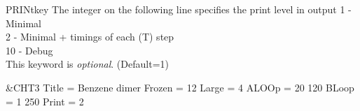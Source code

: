 \begin{keywordlist}
\item[PRINtkey]
The integer on the following line specifies the print level in output
1  - Minimal \\
2  - Minimal + timings of each (T) step \\
10 - Debug \\
This keyword is {\it optional}. (Default=1)
\end{keywordlist}

\begin{inputlisting}
 &CHT3
Title  = Benzene dimer
Frozen = 12
Large  = 4
ALOOp  = 20 120
BLoop  = 1 250
Print  = 2
\end{inputlisting}

